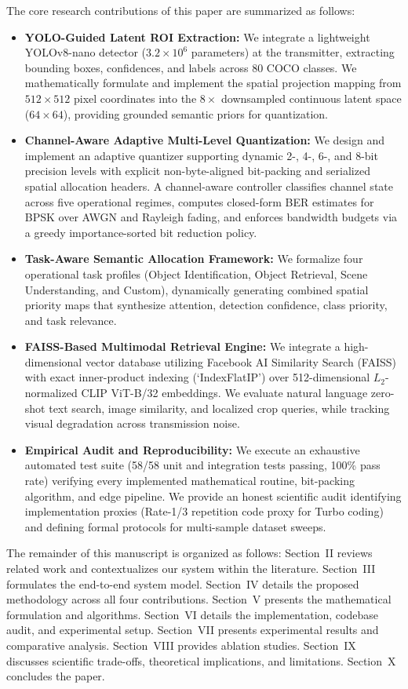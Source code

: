 \documentclass[journal,twocolumn]{IEEEtran}
\begin{document}
The core research contributions of this paper are summarized as follows:
\begin{itemize}
    \item \textbf{YOLO-Guided Latent ROI Extraction:} We integrate a lightweight YOLOv8-nano detector ($3.2\times 10^6$ parameters) at the transmitter, extracting bounding boxes, confidences, and labels across 80 COCO classes. We mathematically formulate and implement the spatial projection mapping from $512\times 512$ pixel coordinates into the $8\times$ downsampled continuous latent space ($64\times 64$), providing grounded semantic priors for quantization.
    \item \textbf{Channel-Aware Adaptive Multi-Level Quantization:} We design and implement an adaptive quantizer supporting dynamic 2-, 4-, 6-, and 8-bit precision levels with explicit non-byte-aligned bit-packing and serialized spatial allocation headers. A channel-aware controller classifies channel state across five operational regimes, computes closed-form BER estimates for BPSK over AWGN and Rayleigh fading, and enforces bandwidth budgets via a greedy importance-sorted bit reduction policy.
    \item \textbf{Task-Aware Semantic Allocation Framework:} We formalize four operational task profiles (Object Identification, Object Retrieval, Scene Understanding, and Custom), dynamically generating combined spatial priority maps that synthesize attention, detection confidence, class priority, and task relevance.
    \item \textbf{FAISS-Based Multimodal Retrieval Engine:} We integrate a high-dimensional vector database utilizing Facebook AI Similarity Search (FAISS) with exact inner-product indexing (`IndexFlatIP') over 512-dimensional $L_2$-normalized CLIP ViT-B/32 embeddings. We evaluate natural language zero-shot text search, image similarity, and localized crop queries, while tracking visual degradation across transmission noise.
    \item \textbf{Empirical Audit and Reproducibility:} We execute an exhaustive automated test suite (58/58 unit and integration tests passing, 100\% pass rate) verifying every implemented mathematical routine, bit-packing algorithm, and edge pipeline. We provide an honest scientific audit identifying implementation proxies (Rate-1/3 repetition code proxy for Turbo coding) and defining formal protocols for multi-sample dataset sweeps.
\end{itemize}

The remainder of this manuscript is organized as follows: Section~II reviews related work and contextualizes our system within the literature. Section~III formulates the end-to-end system model. Section~IV details the proposed methodology across all four contributions. Section~V presents the mathematical formulation and algorithms. Section~VI details the implementation, codebase audit, and experimental setup. Section~VII presents experimental results and comparative analysis. Section~VIII provides ablation studies. Section~IX discusses scientific trade-offs, theoretical implications, and limitations. Section~X concludes the paper.
\end{document}
